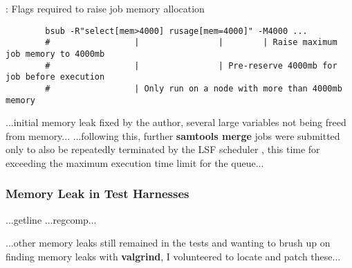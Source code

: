 \begin{listing}[H]
    \caption[lsf-memory]{: Flags required to raise job memory allocation}
    \label{list:lsf-memory}
    \begin{verbatim}
        bsub -R"select[mem>4000] rusage[mem=4000]" -M4000 ...
        #                 |                |        | Raise maximum job memory to 4000mb
        #                 |                | Pre-reserve 4000mb for job before execution
        #                 | Only run on a node with more than 4000mb memory
    \end{verbatim}
\end{listing}

...initial memory leak fixed by the author, several large variables not being
freed from memory...
...following this, further \textbf{samtools merge} jobs were submitted only to
also be repeatedly terminated by the LSF scheduler , this time for exceeding the
maximum execution time limit for the queue...

\subsubsection{Memory Leak in Test Harnesses}
...getline
...regcomp...

...other memory leaks still remained in the tests and wanting to brush up on
finding memory leaks with \textbf{valgrind}, I volunteered to locate and patch
these...


